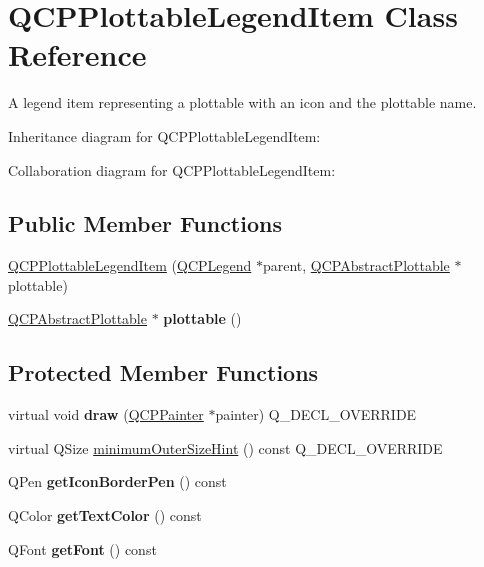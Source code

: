 \hypertarget{classQCPPlottableLegendItem}{}\section{Q\+C\+P\+Plottable\+Legend\+Item Class Reference}
\label{classQCPPlottableLegendItem}


A legend item representing a plottable with an icon and the plottable name.  




Inheritance diagram for Q\+C\+P\+Plottable\+Legend\+Item\+:


Collaboration diagram for Q\+C\+P\+Plottable\+Legend\+Item\+:
\subsection*{Public Member Functions}
\begin{DoxyCompactItemize}
\item 
\hyperlink{classQCPPlottableLegendItem_ac1072591fe409d3dabad51b23ee4d6c5}{Q\+C\+P\+Plottable\+Legend\+Item} (\hyperlink{classQCPLegend}{Q\+C\+P\+Legend} $\ast$parent, \hyperlink{classQCPAbstractPlottable}{Q\+C\+P\+Abstract\+Plottable} $\ast$plottable)
\item 
\mbox{\label{classQCPPlottableLegendItem_af29e9a2c60b4cba0cac2447b8af7b488}} 
\hyperlink{classQCPAbstractPlottable}{Q\+C\+P\+Abstract\+Plottable} $\ast$ {\bfseries plottable} ()
\end{DoxyCompactItemize}
\subsection*{Protected Member Functions}
\begin{DoxyCompactItemize}
\item 
\mbox{\label{classQCPPlottableLegendItem_a5838366619200e99680afa6d355d13fa}} 
virtual void {\bfseries draw} (\hyperlink{classQCPPainter}{Q\+C\+P\+Painter} $\ast$painter) Q\+\_\+\+D\+E\+C\+L\+\_\+\+O\+V\+E\+R\+R\+I\+DE
\item 
virtual Q\+Size \hyperlink{classQCPPlottableLegendItem_a8b543f3ac32b2fe59326e01c1101b3b8}{minimum\+Outer\+Size\+Hint} () const Q\+\_\+\+D\+E\+C\+L\+\_\+\+O\+V\+E\+R\+R\+I\+DE
\item 
\mbox{\label{classQCPPlottableLegendItem_afa81a8bd4434ec249efbbfc2a030a752}} 
Q\+Pen {\bfseries get\+Icon\+Border\+Pen} () const
\item 
\mbox{\label{classQCPPlottableLegendItem_a55daaffee35326765deebf8271efe210}} 
Q\+Color {\bfseries get\+Text\+Color} () const
\item 
\mbox{\label{classQCPPlottableLegendItem_a77d980f594046226f9ac075fa07244b3}} 
Q\+Font {\bfseries get\+Font} () const
\end{DoxyCompactItemize}
